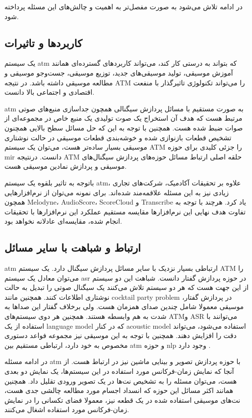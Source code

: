در ادامه تلاش می‌شود به صورت مفصل‌تر به اهمیت و چالش‌های این مسئله پرداخته شود.

\subsection{کاربردها و تاثیرات}
یک سیستم \gls{atm} که بتواند به درستی کار کند، می‌تواند کاربردهای گسترده‌ای
همانند آموزش موسیقی، تولید موسیقی‌های جدید، توزیع موسیقی، جست‌وجو موسیقی و
مطالعه موسیقی داشته باشد. در نتیجه \gls{ATM} را می‌تواند تکنولوژی تاثیرگذار با
منفعت اقتصادی و اجتماعی بالا دانست.

\gls{atm} به صورت مستقیم با مسائل پردازش سیگنالی همچون جداسازی منبع‌های صوتی
مرتبط هست که هدف آن استخراج یک صوت تولیدی یک منبع خاص در مجموعه‌ای از صوات ضبط
شده هست. همچنین با توجه به این که حل مسائل سطح بالایی همچنون تشخیص قطعات
بازنوازی شده و خوشه‌بندی قطعات موسیقی در حالت نوشتاری موسیقی بسیار ساده‌تر هست،
می‌توان یک سیستم \gls{ATM} را جزئی کلیدی برای حوزه \gls{mir} دانست. درنتیجه
\gls{ATM} حلقه اصلی ارتباط مسائل حوزه‌های پردازش سیگنال‌های موسیقی و پردازش
نمادین موسیقی هست.

باتوجه به تاثیر بلقوه یک سیستم \gls{atm}، علاوه بر تحقیقات آکادمیک، شرکت‌های
تجاری زیادی نیز به این مسئله علاقمه‌مند شده‌اند. برای نمونه می‌توان از
نرم‌افزارهایی همچون Melodyne، AudioScore، ScoreCloud و Transcribe یاد کرد. هرچند
با توجه به تفاوت هدف نهایی این نرم‌افزارها مقایسه مستقیم عملکرد این نرم‌افزارها
با تحقیقات انجام شده، مقایسه‌ای عادلانه نخواهد بود.

\subsection{ارتباط و شباهت با سایر مسائل}
\gls{atm} ارتباطی بسیار نزدیک با سایر مسائل پردازش سیگنال دارد. یک سیستم
\gls{ATM} را می‌توان معادل یک سیستم \gls{asr} در حوزه پردازش گفتار دانست. شباهت
این دو سیستم از این جهت هست که هر دو سیستم تلاش می‌کنند یک سیگنال صوتی را تبدیل
به حالت نوشتاری اطلاعات کنند. همچنین مانند \gls{cocktail party problem} در
پردازش گفتار، موسیقی معمولا شامل چندین صدای همزمان هست. ولی برخلاف گفتار این
صداها به شدت به هم وابسطه هستند. همچنین هر دوی سیستم‌های \gls{ATM}و \gls{ASR}
می‌توانند با استفاده از یک \gls{language model} که در کنار \gls{acoustic model} استفاده می‌شود،
می‌تواند دقت را افزایش دهند. همچنین با توجه به این موسیقی نیز مجموعه فواعد
دستوری مخصوص به خود دارد، ارتباطی مستقیم بین \gls{atm} و حوزه \gls{nlp} وجود
دارد \cite{boulanger2012modeling}.

در ادامه مسئله \gls{atm} با حوزه پردازش تصویر و بینایی ماشین نیز در ارتباط هست.
از آنجا که نمایش زمان-فرکانس مورد استفاده در این سیستم‌ها، یک نمایش دو بعدی هست،
می‌توان مسئله را به تشخیص نت‌ها در یک تصویر ورودی تقلیل داد. همچنین همانند اکثر
مسائل این حوزه که انسداد اجسام مورد مطالعه چالشی جدی هست، نت‌های موسیقی استفاده
شده در یک قطعه نیز، معمولا فضای تکسانی را در نمایش زمان-فرکانس مورد استفاده
اشغال می‌کنند.

